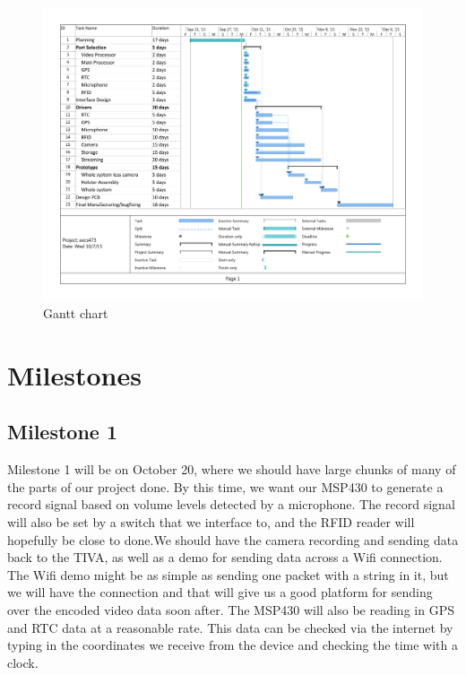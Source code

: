 \documentclass[12pt]{article}
\begin{document}
\begin{landscape}
    \thispagestyle{empty}

    \begin{figure}[h!]
        \centering
        \includegraphics[width=1.2\textwidth]{gantt}
        \caption{Gantt chart}
        \label{fig:gantt}
    \end{figure}
\end{landscape}

\section{Milestones}

\subsection{Milestone 1}

Milestone 1 will be on October 20, where we should have large chunks of many of
the parts of our project done. By this time, we want our MSP430 to generate a
record signal based on volume levels detected by a microphone. The record
signal will also be set by a switch that we interface to, and the RFID reader
will hopefully be close to done.We should have the camera recording and sending
data back to the TIVA, as well as a demo for sending data across a Wifi
connection. The Wifi demo might be as simple as sending one packet with a
string in it, but we will have the connection and that will give us a good
platform for sending over the encoded video data soon after. The MSP430 will
also be reading in GPS and RTC data at a reasonable rate. This data can be
checked via the internet by typing in the coordinates we receive from the
device and checking the time with a clock. 
\end{document}
